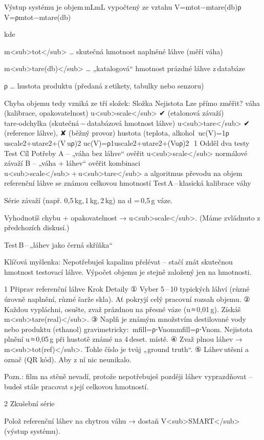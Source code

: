 Výstup systému je objem mLmL vypočtený ze vztahu
V=mtot−mtare(db)ρ
V=ρmtot​−mtare(db)​​

kde

    m<sub>tot</sub> … skutečná hmotnost naplněné láhve (měří váha)

    m<sub>tare(db)</sub> … „katalogová“ hmotnost prázdné láhve z databáze

    ρ … hustota produktu (předaná z etikety, tabulky nebo senzoru)

Chyba objemu tedy vzniká ze tří složek:
Složka	Nejistota	Lze přímo změřit?
váha (kalibrace, opakovatelnost)	u<sub>scale</sub>	✔ (etalonová závaží)
tare‑odchylka (skutečná − databázová hmotnost láhve)	u<sub>tare</sub>	✔ (reference láhve), ✘ (běžný provoz)
hustota (teplota, alkohol %
uc(V)=1ρ uscale2+utare2+(V uρ)2
uc​(V)=ρ1​uscale2​+utare2​+(Vuρ​)2
​
1  Odděl dva testy
Test	Cíl	Potřeby
A – „váha bez láhve“	ověřit u<sub>scale</sub>	normálové závaží
B – „váha + láhev“	ověřit kombinaci u<sub>scale</sub> + u<sub>tare</sub> a algoritmus převodu na objem	referenční láhve se známou celkovou hmotností
Test A – klasická kalibrace váhy

    Série závaží (např. 0,5 kg, 1 kg, 2 kg) na d = 0,5 g váze.

    Vyhodnotíš chybu + opakovatelnost → u<sub>scale</sub>.
    (Máme zvládnuto z předchozích diskusí.)

Test B – „láhev jako černá skříňka“

    Klíčová myšlenka: Nepotřebuješ kapalinu přelévat – stačí znát skutečnou hmotnost testovací láhve. Výpočet objemu je stejně založený jen na hmotnosti.

1  Připrav referenční láhve
Krok	Detaily
① Vyber 5 – 10 typických láhví (různé úrovně naplnění, různé šarže skla).	Ať pokryjí celý pracovní rozsah objemu.
② Každou vypláchni, osušte, zvaž prázdnou na přesné váze (u ≈ 0,01 g).	Získáš m<sub>tare(real)</sub>.
③ Naplň je známým množstvím destilované vody nebo produktu (ethanol) gravimetricky:  mfill=ρ⋅Vnommfill​=ρ⋅Vnom​.	Nejistota plnění u ≈ 0,05 g při hustotě známé na 4 deset. místě.
④ Zvaž plnou láhev → m<sub>tot(ref)</sub>.	Tohle číslo je tvůj „ground truth“.
⑤ Láhev utěsni a označ (QR kód).	Aby z ní nic neunikalo.

    Pozn.: film na stěně nevadí, protože nepotřebuješ později láhev vyprazdňovat – budeš stále pracovat s její celkovou hmotností.

2  Zkušební série

    Polož referenční láhev na chytrou váhu → dostaň V<sub>SMART</sub> (výstup systému).

